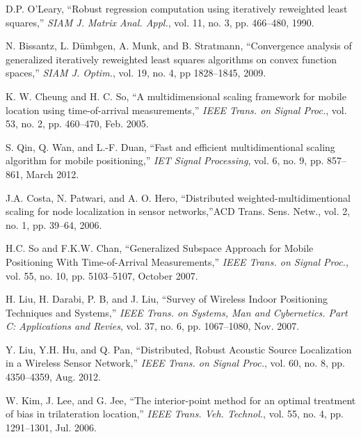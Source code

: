 \begin{thebibliography}{99}
D.P. O'Leary, ``Robust regression computation using iteratively reweighted least squares,'' {\em SIAM J. Matrix Anal. Appl.}, vol. 11, no. 3, pp. 466--480, 1990.

N. Bissantz, L. D\"umbgen, A. Munk, and B.  Stratmann, ``Convergence analysis of generalized iteratively reweighted least squares algorithms on convex function spaces,'' {\em SIAM J. Optim.}, vol. 19, no. 4, pp 1828--1845, 2009.



 \label{r8}
K. W. Cheung and H. C. So, ``A multidimensional scaling framework for mobile location using time-of-arrival measurements,'' {\em IEEE Trans. on Signal Proc.}, vol. 53, no. 2, pp. 460--470, Feb. 2005.

S. Qin, Q. Wan, and L.-F. Duan, ``Fast and efficient multidimentional scaling algorithm for mobile positioning,'' {\em IET Signal Processing}, vol. 6, no. 9, pp. 857--861, March 2012.

J.A. Costa, N. Patwari, and A. O. Hero, ``Distributed weighted-multidimentional scaling for node localization in sensor networks,''ACD Trans. Sens. Netw., vol. 2, no. 1, pp. 39--64, 2006. 

H.C. So and F.K.W. Chan, ``Generalized Subspace Approach for Mobile Positioning With Time-of-Arrival Measurements,'' {\em IEEE Trans. on Signal Proc.}, vol. 55, no. 10, pp. 5103--5107, October 2007.

H. Liu, H. Darabi, P. B, and J. Liu, ``Survey of Wireless Indoor Positioning Techniques and Systems,'' {\em IEEE Trans. on Systems, Man and Cybernetics. Part C: Applications and Revies}, vol. 37, no. 6, pp. 1067--1080, Nov. 2007.

Y. Liu, Y.H. Hu, and Q. Pan, ``Distributed, Robust Acoustic Source Localization in a Wireless Sensor Network,'' {\em IEEE Trans. on Signal Proc.}, vol. 60, no. 8, pp. 4350--4359, Aug. 2012.

W. Kim, J. Lee, and G. Jee, ``The interior-point method for an optimal treatment of bias in trilateration location,'' {\em IEEE Trans. Veh. Technol.}, vol. 55, no. 4, pp. 1291--1301, Jul. 2006.


\end{thebibliography}
